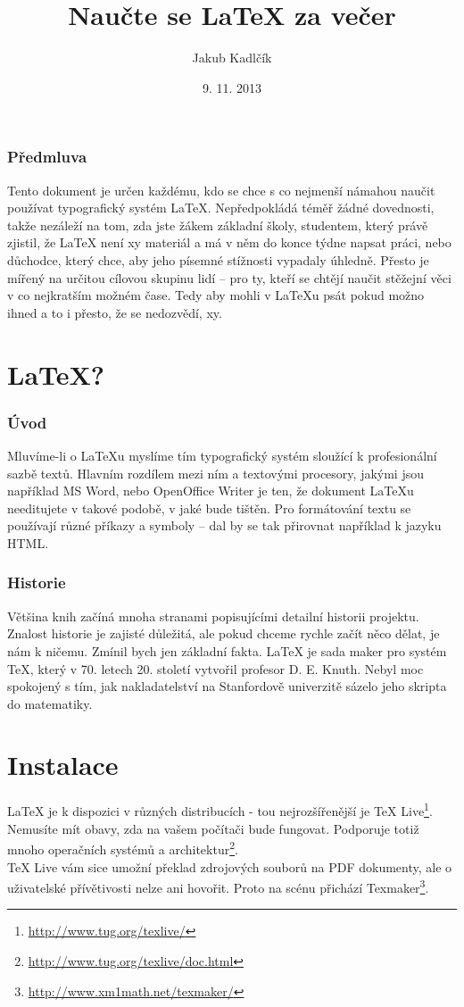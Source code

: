 \documentclass[10pt,a4paper]{article}
\title{Naučte se \LaTeX{} za večer}
\author{Jakub Kadlčík}
\date{9. 11. 2013}
\begin{document}
	\maketitle
	\newpage

	\section*{Předmluva}
	Tento dokument je určen každému, kdo se chce s co nejmenší námahou naučit používat typografický systém LaTeX. Nepředpokládá téměř žádné dovednosti, takže nezáleží na tom, zda jste žákem základní školy, studentem, který právě zjistil, že LaTeX není xy materiál a má v něm do konce týdne napsat práci, nebo důchodce, který chce, aby jeho písemné stížnosti vypadaly úhledně.
	Přesto je mířený na určitou cílovou skupinu lidí -- pro ty, kteří se chtějí naučit stěžejní věci v co nejkratším možném čase. Tedy aby mohli v LaTeXu psát pokud možno ihned a to i přesto, že se nedozvědí, xy.

	\newpage
	\tableofcontents
	\newpage	
	\setcounter{page}{4}
    \part{LaTeX?}
		\section{Úvod}
		Mluvíme-li o LaTeXu myslíme tím typografický systém sloužící k profesionální sazbě textů. Hlavním rozdílem mezi ním a textovými procesory, jakými jsou například MS Word, nebo OpenOffice Writer je ten, že dokument LaTeXu needitujete v takové podobě, v jaké bude tištěn. Pro formátování textu se používají různé příkazy a symboly -- dal by se tak přirovnat například k jazyku HTML.

		\section{Historie}
		Většina knih začíná mnoha stranami popisujícími detailní historii projektu. Znalost historie je zajisté důležitá, ale pokud chceme rychle začít něco dělat, je nám k ničemu. Zmínil bych jen základní fakta. LaTeX je sada maker pro systém TeX, který v 70. letech 20. století vytvořil profesor D. E. Knuth. Nebyl moc spokojený s tím, jak nakladatelství na  Stanfordově univerzitě sázelo jeho skripta do matematiky.

	\newpage
	\part{Instalace}
		LaTeX je k dispozici v různých distribucích - tou nejrozšířenější je TeX Live\footnote{\url{http://www.tug.org/texlive/}}. Nemusíte mít obavy, zda na vašem počítači bude fungovat. Podporuje totiž mnoho operačních systémů a architektur\footnote{\url{http://www.tug.org/texlive/doc.html}}.
		\\
		TeX Live vám sice umožní překlad zdrojových souborů na PDF dokumenty, ale o uživatelské přívětivosti nelze ani hovořit. Proto na scénu přichází Texmaker\footnote{\url{http://www.xm1math.net/texmaker/}}.
\end{document}

